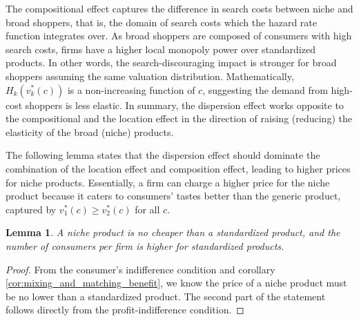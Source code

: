 \documentclass[14pt]{article}
\theoremstyle{plain}
\newtheorem{lemma}[thm]{Lemma}
\theoremstyle{definition}
\theoremstyle{remark}
\DeclareRobustCommand\1{\futurelet\oneNext\oneCheck}
\begin{document}
The compositional effect captures the difference in search costs between niche and broad shoppers, that is, the domain of search costs which the hazard rate function integrates over. As broad shoppers are composed of consumers with high search costs, firms have a higher local monopoly power over standardized products. In other words, the search-discouraging impact is stronger for broad shoppers assuming the same valuation distribution. Mathematically, $H_k(v_k^*(c))$ is a non-increasing function of $c$, suggesting the demand from high-cost shoppers is less elastic. In summary, the dispersion effect works opposite to the compositional and the location effect in the direction of raising (reducing) the elasticity of the broad (niche) products.

The following lemma states that the dispersion effect should dominate the combination of the location effect and composition effect, leading to higher prices for niche products. Essentially, a firm can charge a higher price for the niche product because it caters to consumers' tastes better than the generic product, captured by $v_1^*(c)\geq v_2^*(c)$ for all $c$.

\begin{lemma}
A niche product is no cheaper than a standardized product, and the number of consumers per firm is higher for standardized products.
\end{lemma}
\begin{proof}
From the consumer's indifference condition and corollary \ref{cor:mixing_and_matching_benefit}, we know the price of a niche product must be no lower than a standardized product. The second part of the statement follows directly from the profit-indifference condition.
\end{proof}
\end{document}
